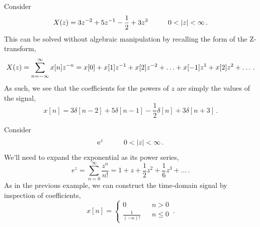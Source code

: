 %
\begin{exmp}
  Consider
  \begin{displaymath}
    X(z) = 3z^{-2} + 5z^{-1} - \frac{1}{2} + 3z^3 \hspace{10mm} 0 < |z| < \infty \,.
  \end{displaymath}
  This can be solved without algebraic manipulation by recalling the
  form of the Z-transform,
  \begin{displaymath}
    X(z) = \sum_{n=-\infty}^\infty x[n]z^{-n} = x[0] + x[1]z^{-1} + x[2]z^{-2}
    + \hdots + x[-1]z^1 + x[2]z^2 + \hdots \,.
  \end{displaymath}
  As such, we see that the coefficients for the powers of $z$ are simply the
  values of the signal,
  \begin{displaymath}
    x[n] = 3\delta[n-2] + 5\delta[n-1] -\frac{1}{2}\delta[n] + 3\delta[n+3] \,.
  \end{displaymath}
\end{exmp}
%
\begin{exmp}
  Consider
  \begin{displaymath}
    \ex{z} \hspace{10mm} 0 < |z| < \infty \,.
  \end{displaymath}
  We'll need to expand the exponential as its power series,
  \begin{displaymath}
    e^z = \sum_{n=0}^\infty \frac{z^n}{n!} = 1 + z + \frac{1}{2}z^2 + \frac{1}{6}z^3 + \hdots \,.
  \end{displaymath}
  As in the previous example, we can construct the time-domain signal
  by inspection of coefficients,
  \begin{displaymath}
    x[n] = \left\{\begin{array}{ccl}
    0 & & n > 0 \\
    \frac{1}{(-n)!} & & n \leq 0
    \end{array}\right. \,.
  \end{displaymath}
\end{exmp}


